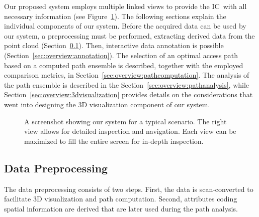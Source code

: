 \documentclass[conference,10pt,letter]{IEEEtran}
\def\IC{IC}
\begin{document}
Our proposed system employs multiple linked views to provide the \IC\ with all necessary information (see Figure~\ref{sec:overview:system}). The following sections explain the individual components of our system. Before the acquired data can be used by our system, a preprocessing must be performed, extracting derived data from the point cloud (Section~\ref{sec:overview:preprocessing}). Then, interactive data annotation is possible (Section~\ref{sec:overview:annotation}). The selection of an optimal access path based on a computed path ensemble is described, together with the employed comparison metrics, in Section~\ref{sec:overview:pathcomputation}. The analysis of the path ensemble is described in the Section~\ref{sec:overview:pathanalysis}, while Section~\ref{sec:overview:3dvisualization} provides details on the considerations that went into designing the 3D visualization component of our system.

\begin{figure}
    \centering
    \caption{A screenshot showing our system for a typical scenario. The right view allows for detailed inspection and navigation. Each view can be maximized to fill the entire screen for in-depth inspection.}
    \label{sec:overview:system}
\end{figure}


\subsection{Data Preprocessing} \label{sec:overview:preprocessing}
The data preprocessing consists of two steps. First, the data is scan-converted to facilitate 3D visualization and path computation. Second, attributes coding spatial information are derived that are later used during the path analysis.
\end{document}
